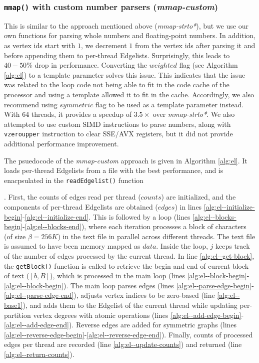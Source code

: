 \subsubsection{\texttt{mmap()} with custom number parsers (\textit{mmap-custom})}
\label{sec:el-mmap-custom}

This is similar to the approach mentioned above (\textit{mmap-strto*}), but we use our own functions for parsing whole numbers and floating-point numbers. In addition, as vertex ids start with $1$, we decrement $1$ from the vertex ids after parsing it and before appending them to per-thread Edgelists. Surprisingly, this leads to $40-50\%$ drop in performance. Converting the $weighted$ flag (see Algorithm \ref{alg:el}) to a template parameter solves this issue. This indicates that the issue was related to the loop code not being able to fit in the code cache of the processor and using a template allowed it to fit in the cache. Accordingly, we also recommend using $symmetric$ flag to be used as a template parameter instead. With 64 threads, it provides a speedup of $3.5\times$ over \textit{mmap-strto*}. We also attempted to use custom SIMD instructions to parse numbers, along with \texttt{vzeroupper} instruction to clear SSE/AVX registers, but it did not provide additional performance improvement.




The psuedocode of the \textit{mmap-custom} approach is given in Algorithm \ref{alg:el}. It loads per-thread Edgelists from a file with the best performance, and is enacpsulated in the \texttt{readEdgelist()} function. First, the counts of edges read per thread ($counts$) are initialized, and the components of per-thread Edgelists are obtained ($edges$) in lines \ref{alg:el--initialize-begin}-\ref{alg:el--initialize-end}. This is followed by a loop (lines \ref{alg:el--blocks-begin}-\ref{alg:el--blocks-end}), where each iteration processes a block of characters (of size $\beta = 256K$) in the text file in parallel across different threads. The text file is assumed to have been memory mapped as $data$. Inside the loop, $j$ keeps track of the number of edges processed by the current thread. In line \ref{alg:el--get-block}, the \texttt{getBlock()} function is called to retrieve the begin and end of current block of text ($[b, B]$), which is processed in the main loop (lines \ref{alg:el--block-begin}-\ref{alg:el--block-begin}). The main loop parses edges (lines \ref{alg:el--parse-edge-begin}-\ref{alg:el--parse-edge-end}), adjusts vertex indices to be zero-based (line \ref{alg:el--base1}), and adds them to the Edgelist of the current thread while updating per-partition vertex degrees with atomic operations (lines \ref{alg:el--add-edge-begin}-\ref{alg:el--add-edge-end}). Reverse edges are added for symmetric graphs (lines \ref{alg:el--reverse-edge-begin}-\ref{alg:el--reverse-edge-end}). Finally, counts of processed edges per thread are recorded (line \ref{alg:el--update-counts}) and returned (line \ref{alg:el--return-counts}).

